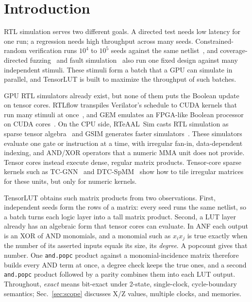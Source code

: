 \documentclass[sigconf]{acmart}
\newcommand{\mmapopc}{\texttt{and.popc}}
\begin{document}


\maketitle

\section{Introduction}
RTL simulation serves two different goals. A directed test needs low latency for one run; a
regression needs high throughput across many seeds. Constrained-random verification runs $10^4$ to
$10^5$ seeds against the same netlist~\cite{crv}, and coverage-directed fuzzing~\cite{rfuzz} and fault
simulation~\cite{ppsfp} also run one fixed design against many independent stimuli. These stimuli
form a batch that a GPU can simulate in parallel, and TensorLUT is built to maximize the throughput
of such batches.

GPU RTL simulators already exist, but none of them puts the Boolean update on tensor cores. RTLflow
transpiles Verilator's schedule to CUDA kernels that run many stimuli at once~\cite{rtlflow}, and GEM
emulates an FPGA-like Boolean processor on CUDA cores~\cite{gem}. On the CPU side, RTeAAL~Sim casts
RTL simulation as sparse tensor algebra~\cite{rteaal} and GSIM generates faster simulators~\cite{gsim}.
These simulators evaluate one gate or instruction at a time, with irregular fan-in,
data-dependent indexing, and AND/XOR operators that a numeric MMA unit does not provide. Tensor cores
instead execute dense, regular matrix products. Tensor-core sparse kernels such as TC-GNN~\cite{tcgnn} and DTC-SpMM~\cite{dtcspmm} show how to
tile irregular matrices for these units, but only for numeric kernels.

TensorLUT obtains such matrix products from two observations. First, independent seeds form the rows
of a matrix: every seed runs the same netlist, so a batch turns each logic layer into a tall matrix
product. Second, a LUT
layer already has an algebraic form that tensor cores can evaluate. In ANF each output is an XOR of AND
monomials, and a monomial such as $x_i x_j$ is true exactly when the number of its asserted inputs
equals its size, its \emph{degree}. A popcount gives that number. One \mmapopc{} product against a
monomial-incidence matrix therefore builds every AND term at once, a degree check keeps the true ones,
and a second \mmapopc{} product followed by a parity combines them into each LUT output. Throughout,
\emph{exact} means bit-exact under 2-state, single-clock, cycle-boundary semantics;
Sec.~\ref{sec:scope} discusses X/Z values, multiple clocks, and memories.
\end{document}
